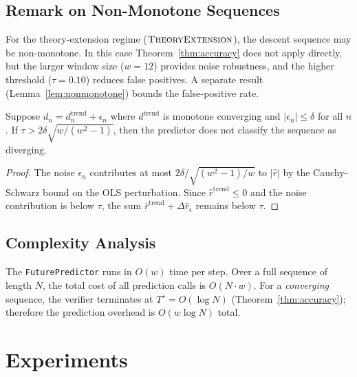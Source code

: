 \documentclass[11pt]{article}
\newcommand{\DescentRate}{r}                %
\newcommand{\RKtheo}{\textsc{TheoryExtension}}
\newcommand{\Thresh}{\tau}                  %
\newcommand{\WindowSize}{w}                 %
\newcommand{\StepsToDecide}{T^{\star}}      %
\newcommand{\maxstep}{N}                    %
\begin{document}
\subsection{Remark on Non-Monotone Sequences}

For the theory-extension regime ($\RKtheo$), the descent sequence may
be non-monotone.  In this case Theorem~\ref{thm:accuracy} does not
apply directly, but the larger window size ($\WindowSize = 12$) provides
noise robustness, and the higher threshold ($\Thresh = 0.10$) reduces
false positives.  A separate result (Lemma~\ref{lem:nonmonotone}) bounds
the false-positive rate.

\begin{lemma}\label{lem:nonmonotone}
Suppose $d_n = d_n^{\mathrm{trend}} + \epsilon_n$ where
$d^{\mathrm{trend}}$ is monotone converging and $|\epsilon_n| \le \delta$
for all $n$.  If $\Thresh > 2\delta\sqrt{w/(w^2-1)}$, then the
predictor does not classify the sequence as diverging.
\end{lemma}

\begin{proof}
The noise $\epsilon_n$ contributes at most $2\delta/\sqrt{(w^2-1)/w}$
to $|\hat{\DescentRate}|$ by the Cauchy-Schwarz bound on the OLS
perturbation.  Since $\hat{\DescentRate}^{\mathrm{trend}} \le 0$ and
the noise contribution is below $\Thresh$, the sum $\hat{\DescentRate}^{\mathrm{trend}}
+ \Delta\hat{\DescentRate}_{\epsilon}$ remains below $\Thresh$.
\end{proof}

\subsection{Complexity Analysis}

\begin{corollary}\label{cor:complexity}
The \texttt{FuturePredictor} runs in $O(\WindowSize)$ time per step.
Over a full sequence of length $\maxstep$, the total cost of all
prediction calls is $O(\maxstep \cdot \WindowSize)$.  For a
\emph{converging} sequence, the verifier terminates at
$\StepsToDecide = O(\log \maxstep)$ (Theorem~\ref{thm:accuracy});
therefore the prediction overhead is $O(\WindowSize \log \maxstep)$
total.
\end{corollary}

\section{Experiments}\label{sec:experiments}
\end{document}
